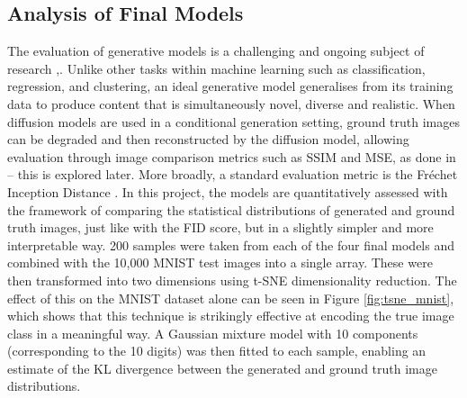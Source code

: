 \documentclass[12pt]{article}
\begin{document}
\subsection{Analysis of Final Models}
The evaluation of generative models is a challenging and ongoing subject of research \cite{betzalel2022study},\cite{fi15080260}.
Unlike other tasks within machine learning such as classification, regression, and clustering,
an ideal generative model generalises from its training data to produce content that is simultaneously novel, diverse and realistic.
When diffusion models are used in a conditional generation setting, ground truth images can be degraded and then reconstructed by the diffusion model,
allowing evaluation through image comparison metrics such as SSIM and MSE, as done in \cite{bansal2022cold} -- this is explored later.
More broadly, a standard evaluation metric is the Fr\'echet Inception Distance \cite{NIPS2017_8a1d6947}.
In this project, the models are quantitatively assessed with the framework of comparing the statistical distributions of generated and ground truth images,
just like with the FID score, but in a slightly simpler and more interpretable way.
200 samples were taken from each of the four final models and combined with the 10,000 MNIST test images into a single array.
These were then transformed into two dimensions using t-SNE dimensionality reduction.
The effect of this on the MNIST dataset alone can be seen in Figure \ref{fig:tsne_mnist},
which shows that this technique is strikingly effective at encoding the true image class in a meaningful way.
A Gaussian mixture model with 10 components (corresponding to the 10 digits) was then fitted to each sample,
enabling an estimate of the KL divergence between the generated and ground truth image distributions.
\end{document}
